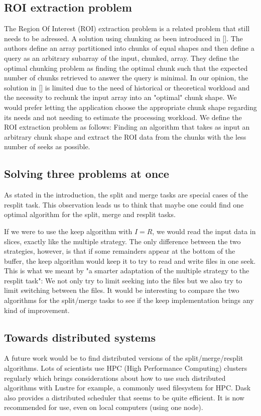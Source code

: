 \documentclass[conference]{IEEEtran}
\begin{document}
\subsection{ROI extraction problem}
The Region Of Interest (ROI) extraction problem is a related problem that still needs
to be adressed. A solution using chunking as been introduced in []. The authors
define an array partitioned into chunks of equal shapes and then define a
query as an arbitrary subarray of the input, chunked, array. They define the
optimal chunking problem as finding the optimal chunk such that the expected
number of chunks retrieved to answer the query is minimal. In our opinion, the
solution in [] is limited due to the need of historical or theoretical workload
and the necessity to rechunk the input array into an "optimal" chunk shape. We
would prefer letting the application choose the appropriate chunk shape
regarding its needs and not needing to estimate the processing workload. We
define the ROI extraction problem as follows: Finding an algorithm that takes
as input an arbitrary chunk shape and extract the ROI data from the chunks with
the less number of seeks as possible.

\subsection{Solving three problems at once}
As stated in the introduction, the split and merge tasks are special cases of
the resplit task. This observation leads us to think that maybe one could find
one optimal algorithm for the split, merge and resplit tasks.

If we were to use the keep algorithm with $I=R$, we would read the input data
in slices, exactly like the multiple strategy. The only difference between the
two strategies, however, is that if some remainders appear at the bottom of the
buffer, the keep algorithm would keep it to try to read and write files in one
seek. This is what we meant by "a smarter adaptation of the multiple strategy
to the resplit task": We not only try to limit seeking into the files but we
also try to limit switching between the files. It would be interesting to
compare the two algorithms for the split/merge tasks to see if the keep
implementation brings any kind of improvement.

\subsection{Towards distributed systems}
A future work would be to find distributed versions of the split/merge/resplit
algorithms. Lots of scientists use HPC (High Performance Computing) clusters
regularly which brings considerations about how to use such distributed
algorithms with Lustre for example, a commonly used filesystem for HPC. Dask
also provides a distributed scheduler that seems to be quite efficient. It is
now recommended for use, even on local computers (using one node).
\end{document}
